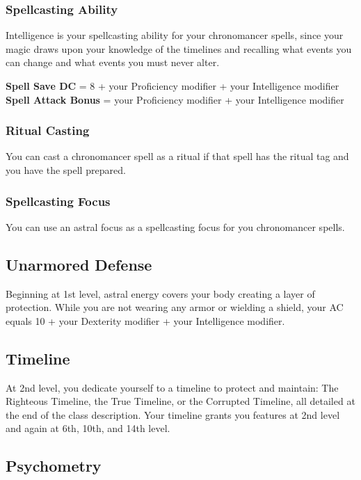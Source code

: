 \subsubsection{Spellcasting Ability}

Intelligence is your spellcasting ability for your chronomancer spells, since your magic draws upon your knowledge of the timelines and recalling what events you can change and what events you must never alter.
\begin{center}
\textbf{Spell Save DC} = 8 + your Proficiency modifier + your Intelligence modifier\\
\textbf{Spell Attack Bonus} = your Proficiency modifier + your Intelligence modifier
\end{center}

\subsubsection{Ritual Casting}

You can cast a chronomancer spell as a ritual if that spell has the ritual tag and you have the spell prepared.

\subsubsection{Spellcasting Focus}

You can use an astral focus as a spellcasting focus for you chronomancer spells.

\subsection{Unarmored Defense}

Beginning at 1st level, astral energy covers your body creating a layer of protection. While you are not wearing any armor or wielding a shield, your AC equals 10 + your Dexterity modifier + your Intelligence modifier.

\subsection{Timeline}

At 2nd level, you dedicate yourself to a timeline to protect and maintain: The Righteous Timeline, the True Timeline, or the Corrupted Timeline, all detailed at the end of the class description. Your timeline grants you features at 2nd level and again at 6th, 10th, and 14th level.

\subsection{Psychometry}

